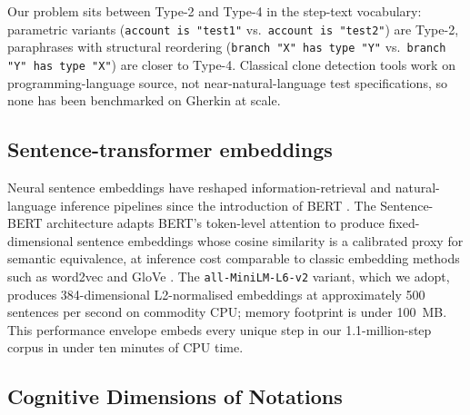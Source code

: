 \documentclass[11pt,a4paper]{article}
\begin{document}
Our problem sits between Type-2 and Type-4 in the
step-text vocabulary: parametric variants (\texttt{account is "test1"}
vs.\ \texttt{account is "test2"}) are Type-2, paraphrases with structural
reordering (\texttt{branch "X" has type "Y"} vs.\ \texttt{branch "Y" has
type "X"}) are closer to Type-4. Classical clone detection tools work on
programming-language source, not near-natural-language test
specifications, so none has been benchmarked on Gherkin at scale.

\subsection{Sentence-transformer embeddings}

Neural sentence embeddings have reshaped information-retrieval and
natural-language inference pipelines since the introduction of
BERT \citep{devlin2019bert}. The Sentence-BERT architecture
\citep{reimers2019sbert} adapts BERT's token-level attention to produce
fixed-dimensional sentence embeddings whose cosine similarity is a
calibrated proxy for semantic equivalence, at inference cost comparable
to classic embedding methods such as word2vec \citep{mikolov2013word2vec}
and GloVe \citep{pennington2014glove}. The \texttt{all-MiniLM-L6-v2}
variant, which we adopt, produces 384-dimensional L2-normalised
embeddings at approximately 500 sentences per second on commodity CPU;
memory footprint is under 100~MB. This performance envelope embeds
every unique step in our 1.1-million-step corpus in under ten
minutes of CPU time.

\subsection{Cognitive Dimensions of Notations}
\label{sec:background:cdn}
\end{document}
